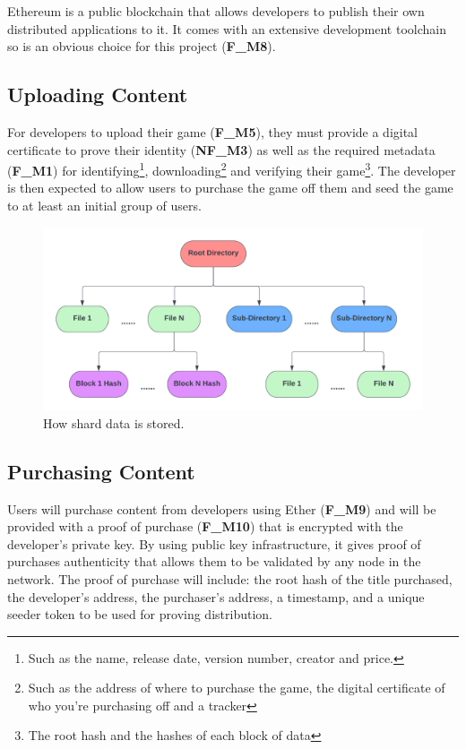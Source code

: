 \noindent Ethereum is a public blockchain that allows developers to publish their own distributed applications to it. It comes with an extensive development toolchain so is an obvious choice for this project (\textbf{F\_M8}).

\subsection*{Uploading Content}
\label{subsec:upload-content}

For developers to upload their game (\textbf{F\_M5}), they must provide a digital certificate to prove their identity (\textbf{NF\_M3}) as well as the required metadata (\textbf{F\_M1}) for identifying\footnote{Such as the name, release date, version number, creator and price.}, downloading\footnote{Such as the address of where to purchase the game, the digital certificate of who you're purchasing off and a tracker} and verifying their game\footnote{The root hash and the hashes of each block of data}. The developer is then expected to allow users to purchase the game off them and seed the game to at least an initial group of users.

\begin{figure}[ht]
  \centering
  \includegraphics[width=.85\textwidth]{assets/images/diagrams/block-body.png}
  \caption{How shard data is stored.}
  \label{fig:hash-storage}
\end{figure}

\subsection*{Purchasing Content}

Users will purchase content from developers using Ether (\textbf{F\_M9}) and will be provided with a proof of purchase (\textbf{F\_M10}) that is encrypted with the developer's private key. By using public key infrastructure, it gives proof of purchases authenticity that allows them to be validated by any node in the network. The proof of purchase will include: the root hash of the title purchased, the developer's address, the purchaser's address, a timestamp, and a unique seeder token to be used for proving distribution.

